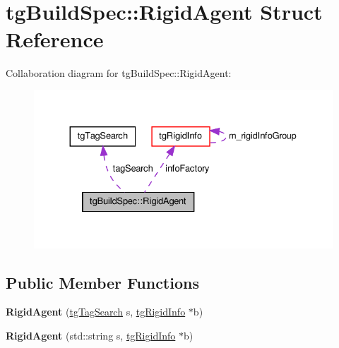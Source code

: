 \hypertarget{structtg_build_spec_1_1_rigid_agent}{\section{tg\-Build\-Spec\-:\-:Rigid\-Agent Struct Reference}
\label{structtg_build_spec_1_1_rigid_agent}
}


Collaboration diagram for tg\-Build\-Spec\-:\-:Rigid\-Agent\-:\nopagebreak
\begin{figure}[H]
\begin{center}
\leavevmode
\includegraphics[width=330pt]{structtg_build_spec_1_1_rigid_agent__coll__graph}
\end{center}
\end{figure}
\subsection*{Public Member Functions}
\begin{DoxyCompactItemize}
\item 
\hypertarget{structtg_build_spec_1_1_rigid_agent_a758aa23380f8ac30c571128d0301e4d3}{{\bfseries Rigid\-Agent} (\hyperlink{classtg_tag_search}{tg\-Tag\-Search} s, \hyperlink{classtg_rigid_info}{tg\-Rigid\-Info} $\ast$b)}\label{structtg_build_spec_1_1_rigid_agent_a758aa23380f8ac30c571128d0301e4d3}

\item 
\hypertarget{structtg_build_spec_1_1_rigid_agent_ad30da170ecf1021387e9ac31935c63e4}{{\bfseries Rigid\-Agent} (std\-::string s, \hyperlink{classtg_rigid_info}{tg\-Rigid\-Info} $\ast$b)}\label{structtg_build_spec_1_1_rigid_agent_ad30da170ecf1021387e9ac31935c63e4}

\end{DoxyCompactItemize}
